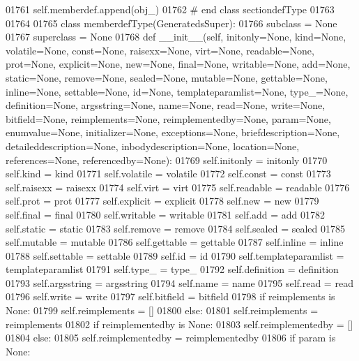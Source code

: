 \begin{DoxyCode}
{{{{{{{{{{{{{{{{{{{{{{{{{{{{{{{{{{{{{{{{{{{{{{{{{{{{{{{{{{{{{{{{{{{{{{{{{{{{{{{{{{{{{{{{{{{{{{{{{{{{{{{{{{{{{{{{{{01761             self.memberdef.append(obj\_)
01762 \textcolor{comment}{# end class sectiondefType}
01763 
01764 
01765 \textcolor{keyword}{class }memberdefType(GeneratedsSuper):
01766     subclass = \textcolor{keywordtype}{None}
01767     superclass = \textcolor{keywordtype}{None}
01768     \textcolor{keyword}{def }__init__(self, initonly=None, kind=None, volatile=None, const=None, raisexx=None, virt=None, 
      readable=None, prot=None, explicit=None, new=None, final=None, writable=None, add=None, static=None, remove=None, 
      sealed=None, mutable=None, gettable=None, inline=None, settable=None, id=None, templateparamlist=None, 
      type\_=None, definition=None, argsstring=None, name=None, read=None, write=None, bitfield=None, reimplements=None,
       reimplementedby=None, param=None, enumvalue=None, initializer=None, exceptions=None, briefdescription=None,
       detaileddescription=None, inbodydescription=None, location=None, references=None, referencedby=None):
01769         self.initonly = initonly
01770         self.kind = kind
01771         self.volatile = volatile
01772         self.const = const
01773         self.raisexx = raisexx
01774         self.virt = virt
01775         self.readable = readable
01776         self.prot = prot
01777         self.explicit = explicit
01778         self.new = new
01779         self.final = final
01780         self.writable = writable
01781         self.add = add
01782         self.static = static
01783         self.remove = remove
01784         self.sealed = sealed
01785         self.mutable = mutable
01786         self.gettable = gettable
01787         self.inline = inline
01788         self.settable = settable
01789         self.id = id
01790         self.templateparamlist = templateparamlist
01791         self.type_ = type\_
01792         self.definition = definition
01793         self.argsstring = argsstring
01794         self.name = name
01795         self.read = read
01796         self.write = write
01797         self.bitfield = bitfield
01798         \textcolor{keywordflow}{if} reimplements \textcolor{keywordflow}{is} \textcolor{keywordtype}{None}:
01799             self.reimplements = []
01800         \textcolor{keywordflow}{else}:
01801             self.reimplements = reimplements
01802         \textcolor{keywordflow}{if} reimplementedby \textcolor{keywordflow}{is} \textcolor{keywordtype}{None}:
01803             self.reimplementedby = []
01804         \textcolor{keywordflow}{else}:
01805             self.reimplementedby = reimplementedby
01806         \textcolor{keywordflow}{if} param \textcolor{keywordflow}{is} \textcolor{keywordtype}{None}:
}}}}}}}}}}}}}}}}}}}}}}}}}}}}}}}}}}}}}}}}}}}}}}}}}}}}}}}}}}}}}}}}}}}}}}}}}}}}}}}}}}}}}}}}}}}}}}}}}}}}}}}}}}}}}}}}}}
\end{DoxyCode}
